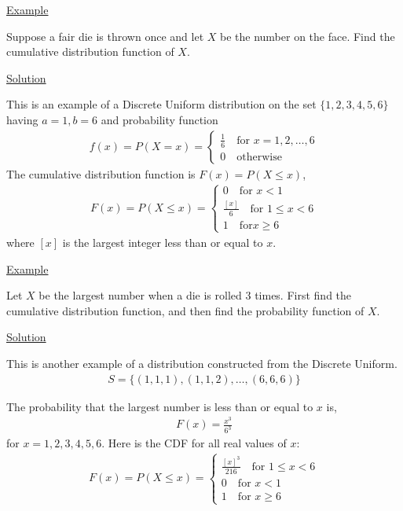 \documentclass{article}
\begin{document}
\underline{Example}

Suppose a fair die is thrown once and let $X$ be the number on the face. Find the cumulative distribution function of $X$. 

\underline{Solution}

This is an example of a Discrete Uniform distribution on the set $\{1,2,3,4,5,6\}$ having $a=1,b=6$ and probability function
\begin{align*}
    f(x) = P(X=x) = \begin{cases}
        \frac{1}{6} \quad \text{for } x = 1,2,\ldots,6\\
        0 \quad \text{otherwise}
    \end{cases}
\end{align*}
The cumulative distribution function is $F(x) = P(X\le x)$,
\begin{align*}
    F(x) = P(X \le x) = \begin{cases}
        0 \quad \text{for } x < 1\\
        \frac{[x]}{6} \quad \text{for } 1 \le x < 6\\
        1 \quad \text{for} x \ge 6
    \end{cases}
\end{align*}
where $[x]$ is the largest integer less than or equal to $x$.

\underline{Example}

Let $X$ be the largest number when a die is rolled 3 times. First find the cumulative distribution function, and then find the probability function of $X$. 

\underline{Solution}

This is another example of a distribution constructed from the Discrete Uniform. 
\begin{align*}
    S = \{(1,1,1),(1,1,2),\ldots,(6,6,6)\}
\end{align*}

The probability that the largest number is less than or equal to $x$ is,
\begin{align*}
    F(x) = \frac{x^3}{6^3}
\end{align*}
for $x = 1,2,3,4,5,6$. Here is the CDF for all real values of $x$:
\begin{align*}
    F(x) = P(X \le x) = \begin{cases}
        \frac{[x]^3}{216} \quad \text{for } 1 \le x < 6\\
        0 \quad \text{for } x < 1\\
        1 \quad \text{for } x \ge 6
    \end{cases}
\end{align*}
\end{document}
